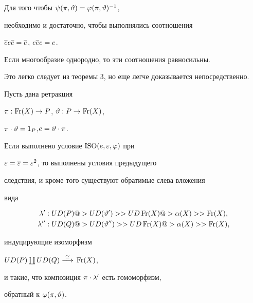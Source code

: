 \begin{cor} Для того чтобы $\psi(\pi,\vartheta)=\varphi(\pi,\vartheta)^{-1}$,


необходимо и достаточно, чтобы выполнялись соотношения


$\overline{e} e \overline{e} = \overline{e} $, $e \overline{e} e = e$.


Если многообразие однородно, то эти соотношения равносильны.


\end{cor}





Это легко следует из теоремы 3, но еще легче доказывается непосредственно.





\begin{cor}


Пусть дана ретракция


$ \pi : \operatorname{Fr}(X)\to P$, $ \vartheta : P\to \operatorname{Fr}(X)$,


$\pi\cdot\vartheta=1_P $,$ e=\vartheta\cdot\pi$.


Если выполнено условие ${\mathrm{ISO}}(e,\varepsilon,\varphi) $ при


$\varepsilon=\overline{\varepsilon}=\varepsilon^2$, то выполнены условия предыдущего


следствия, и кроме того существуют обратимые слева вложения


вида


\begin{align*}






\la' &: UD(P) @>{UD(\te')}>> UD\Fr(X) @>{\alpha(X)}>> \Fr(X),\\


\la'' &: UD(Q) @>{UD(\te'')}>> UD\Fr(X) @>{\alpha(X)}>> \Fr(X),


\end{align*}


индуцирующие изоморфизм


$UD(P) \coprod UD(Q)\overset{\cong}{\longrightarrow}{} \operatorname{Fr}(X)$,


и такие, что композиция $\pi\cdot\lambda'$ есть гомоморфизм,


обратный к $\varphi(\pi,\vartheta)$.


\end{cor}





